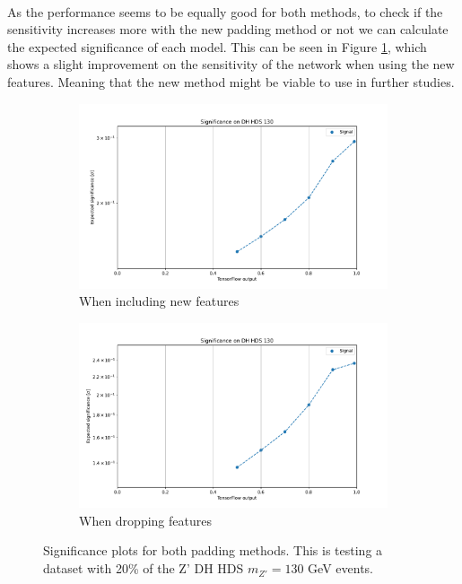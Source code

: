\documentclass[12pt, a4paper]{book}
\begin{document}
\\As the performance seems to be equally good for both methods, to check if the sensitivity increases more with the new padding method or not we can calculate the expected significance of each model. 
This can be seen in Figure \ref{fig:NN_pad_SIG}, which shows a slight improvement on the sensitivity of the network when using the new features. Meaning that the new method might be viable to use in further studies.
\begin{figure}[!ht]
	\centering
	\begin{subfigure}[b]{0.49\textwidth}
      \centering
      \includegraphics[width=1\textwidth]{New_pad/EXP_SIG.pdf}
      \caption{When including new features}
   \end{subfigure}
   \hfill
	\begin{subfigure}[b]{0.49\textwidth}
      \centering
      \includegraphics[width=1\textwidth]{No_pad/EXP_SIG.pdf}
      \caption{When dropping features}
   \end{subfigure}
   \caption[Significance plots for both padding methods]{Significance plots for both padding methods.  This is testing a dataset with 20\% of the Z' DH HDS $m_{Z'}=130$ GeV events.}\label{fig:NN_pad_SIG}
\end{figure}
\clearpage
\end{document}
